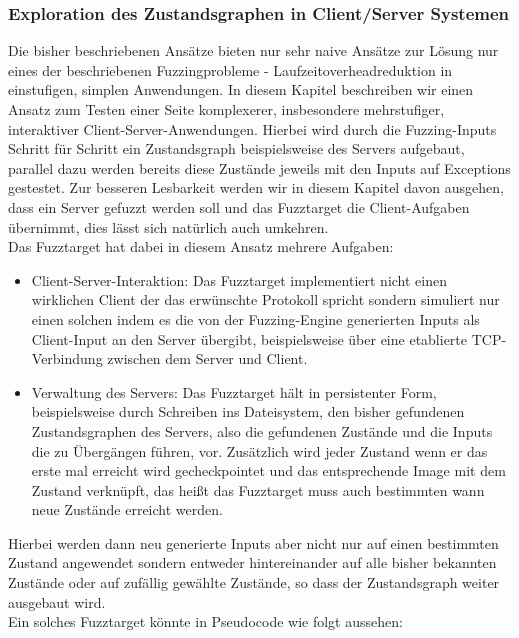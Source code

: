 \documentclass[a4paper]{article}
\begin{document}
\subsubsection{Exploration des Zustandsgraphen in Client/Server Systemen}
Die bisher beschriebenen Ansätze bieten nur sehr naive Ansätze zur Lösung nur eines der beschriebenen Fuzzingprobleme - Laufzeitoverheadreduktion in einstufigen, simplen Anwendungen. 
In diesem Kapitel beschreiben wir einen Ansatz zum Testen einer Seite komplexerer, insbesondere mehrstufiger, interaktiver Client-Server-Anwendungen. 
Hierbei wird durch die Fuzzing-Inputs Schritt für Schritt ein Zustandsgraph beispielsweise des Servers aufgebaut, parallel dazu werden bereits diese Zustände jeweils mit den Inputs auf Exceptions gestestet. 
Zur besseren Lesbarkeit werden wir in diesem Kapitel davon ausgehen, dass ein Server gefuzzt werden soll und das Fuzztarget die Client-Aufgaben übernimmt, dies lässt sich natürlich auch umkehren.\\
Das Fuzztarget hat dabei in diesem Ansatz mehrere Aufgaben:
\begin{itemize}
    \item Client-Server-Interaktion: Das Fuzztarget implementiert nicht einen wirklichen Client der das erwünschte Protokoll spricht sondern simuliert nur einen solchen indem es die von der Fuzzing-Engine generierten Inputs als Client-Input an den Server übergibt, beispielsweise über eine etablierte TCP-Verbindung zwischen dem Server und Client.
    \item Verwaltung des Servers: Das Fuzztarget hält in persistenter Form, beispielsweise durch Schreiben ins Dateisystem, den bisher gefundenen Zustandsgraphen des Servers, also die gefundenen Zustände und die Inputs die zu Übergängen führen, vor. Zusätzlich wird jeder Zustand wenn er das erste mal erreicht wird gecheckpointet und das entsprechende Image mit dem Zustand verknüpft, das heißt das Fuzztarget muss auch bestimmten wann neue Zustände erreicht werden.
\end{itemize}
Hierbei werden dann neu generierte Inputs aber nicht nur auf einen bestimmten Zustand angewendet sondern entweder hintereinander auf alle bisher bekannten Zustände oder auf zufällig gewählte Zustände, so dass der Zustandsgraph weiter ausgebaut wird.\\
Ein solches Fuzztarget könnte in Pseudocode wie folgt aussehen:
\end{document}
